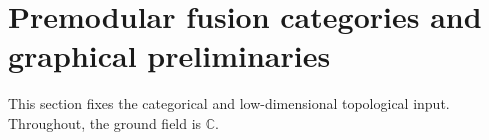 \section{Premodular fusion categories and graphical preliminaries}
\label{sec:preliminaries}

This section fixes the categorical and low-dimensional topological input.
Throughout, the ground field is $\mathbb C$.



